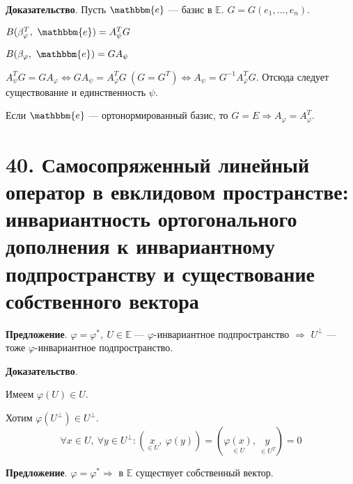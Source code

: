 \documentclass[a4paper, 12pt]{article}
\newcommand{\E}{\mathbb{E}}
\newcommand{\me}{\mathbbm{e}}
\begin{document}
\textbf{Доказательство}. Пусть $\me$ --- базис в $\E$. $G = G(e_1, \ldots, e_n)$.

$B(\beta_\varphi^T,\ \me) = A_\psi^T G$

$B(\beta_\varphi,\ \me) = GA_\psi$

$A_\psi^TG = GA_\varphi \Leftrightarrow GA_\psi = A_\varphi^TG\ (G = G^T) \Leftrightarrow A_\psi = G^{-1}A_\varphi^TG$. Отсюда следует существование и единственность $\psi$.

Если $\me$ --- ортонормированный базис, то $G = E \Rightarrow A_\varphi = A_\varphi^T$.

\section*{40. Самосопряженный линейный оператор в евклидовом пространстве: инвариантность ортогонального дополнения к инвариантному подпространству и существование собственного вектора}
\textbf{Предложение}. $\varphi = \varphi^*,\ U \in \E$ --- $\varphi$-инвариантное подпространство $\Rightarrow$ $U^\bot$ --- тоже $\varphi$-инвариантное подпространство.

\textbf{Доказательство}.

Имеем $\varphi(U) \in U$.

Хотим $\varphi(U^\bot) \in U^\bot$.
\vspace{-3mm}
\[
\forall x \in U,\ \forall y \in U^\bot: (\underset{\in U}{x},\ \varphi(y)) = (\underset{\in U}{\varphi(x)},\ \underset{\in U^T}{y}) = 0
\]

\textbf{Предложение}. $\varphi = \varphi^* \Rightarrow$ в $\E$ существует собственный вектор.
\end{document}
